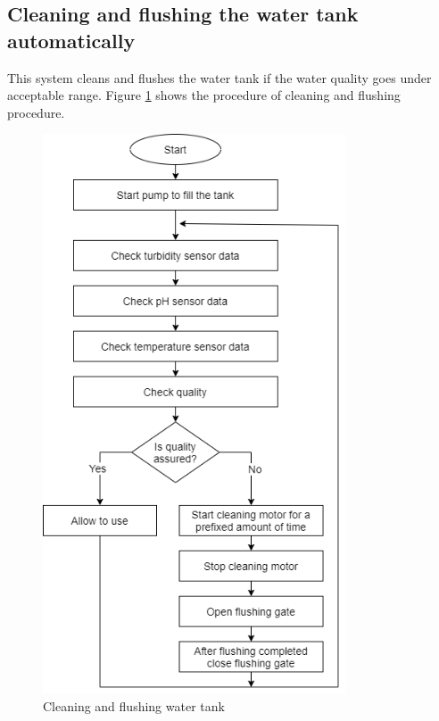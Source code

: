 \subsection{Cleaning and flushing the water tank automatically }
This system cleans and flushes the water tank if the  water quality goes under acceptable range. Figure \ref{cleaningFlushing} shows the procedure of cleaning and flushing procedure.
\begin{figure}[H]
\centering
\includegraphics[width=0.8\textwidth]{figures/flow chart of cleaning.png}
\caption{Cleaning and flushing water tank}
\label{cleaningFlushing}
\end{figure}

